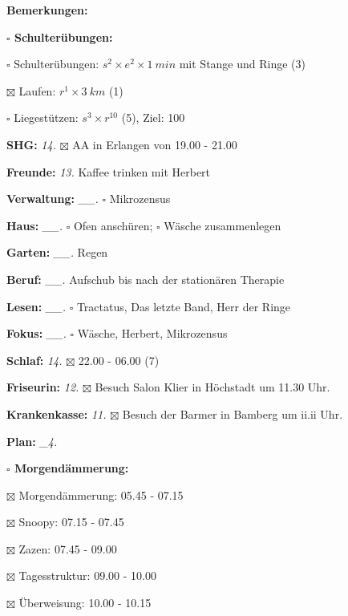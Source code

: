 \documentclass[10pt,a4paper]{article}
\newcommand\prop[1] {{\color {alizarin} {\bf #1}}}        %
\newcommand\opti[1] {{\color {amethyst} {\bf #1}}}        %
\newcommand\mand[1] {{\color {burntorange} {\bf #1}}}     %
\newcommand\topspace{\vskip -15pt \hskip 20pt}
\newcommand\bottomspace{\vskip 4pt}
\newcommand\n[1] { {\sl #1.} \hskip 5pt }
\begin{document}
\begin{mdframed}[style=daystyle]
\begin{labeling}{{\mand {Bemerkungen:}}}
\begin{minipage}{0.75\textwidth}
\begin{labeling}{\prop {$\square$ {Schulterübungen:}}}
      \item[$\square$ Schulterübungen:] $s^2 \times e^2 \times 1\ min$ mit Stange und Ringe (3)
      \item[$\boxtimes$ Laufen:]          $r^1 \times 3\ km$ (1)
      \item[$\square$ Liegestützen:]    $s^3 \times r^{10}$ (5), Ziel: 100
      \end{labeling}
    \end{minipage}
    \bottomspace        
  \item[{\mand {SHG:}}]            \n{14} $\boxtimes$ AA in Erlangen von 19.00 - 21.00
  \item[{\mand {Freunde:}}]        \n{13} Kaffee trinken mit Herbert
  \item[{\mand {Verwaltung:}}]   \n{\_\_} $\square$ Mikrozensus
  \item[{\mand {Haus:}}]         \n{\_\_} $\square$ Ofen anschüren; $\square$ Wäsche zusammenlegen
  \item[{\mand {Garten:}}]       \n{\_\_} Regen
  \item[{\mand {Beruf:}}]        \n{\_\_} Aufschub bis nach der stationären Therapie
  \item[{\mand {Lesen:}}]        \n{\_\_} $\square$ Tractatus, Das letzte Band, Herr der Ringe
  \item[{\mand {Fokus:}}]        \n{\_\_} $\square$ Wäsche, Herbert, Mikrozensus
  \item[{\mand {Schlaf:}}]         \n{14} $\boxtimes$ 22.00 - 06.00 (7)
  \item[{\opti {Friseurin:}}]      \n{12} $\boxtimes$ Besuch Salon Klier in Höchstadt um 11.30 Uhr.
  \item[{\opti {Krankenkasse:}}]   \n{11} $\boxtimes$ Besuch der Barmer in Bamberg um ii.ii Uhr.
  \item[{\mand {Plan:}}]          \n{\_4}
    \topspace
    \begin{minipage}{0.75\textwidth}  
      \begin{labeling}{\prop {$\square$ {Morgendämmerung:}}} 
        \setlength\itemsep{-3pt}
      \item[$\boxtimes$ Morgendämmerung:] 05.45 - 07.15
      \item[$\boxtimes$ Snoopy:]          07.15 - 07.45
      \item[$\boxtimes$ Zazen:]           07.45 - 09.00
      \item[$\boxtimes$ Tagesstruktur:]   09.00 - 10.00
      \item[$\boxtimes$ Überweisung:]     10.00 - 10.15

\end{labeling}
\end{minipage}
\end{labeling}
\end{mdframed}
\end{document}

